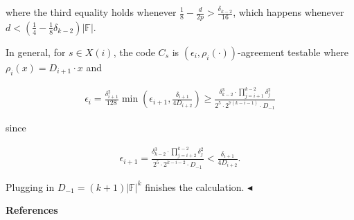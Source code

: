 where the third equality holds whenever $\frac{1}{8}-\frac{d}{2p}>\frac{\delta_{k-2}}{16}$, which happens whenever $d<\left(\frac{1}{4}-\frac{1}{8}\delta_{k-2}\right)|\mathbb{F}|$.\par




In general, for $s\in X(i)$, the code $C_{s}$ is $(\epsilon_{i},\rho_{i}(\cdot))$-agreement testable where $\rho_{i}(x)=D_{i+1}\cdot x$ and\par


\[\begin{gathered}
\displaystyle\epsilon_{i} \displaystyle=\frac{\delta_{i+1}^{2}}{128}\min\left(\epsilon_{i+1},\frac{\delta_{i+1}}{4D_{i+2}}\right)\geq\frac{\delta_{k-2}^{3}\cdot\prod_{j=i+1}^{k-2}\delta_{j}^{2}}{2^{5}\cdot 2^{7(k-i-1)}\cdot D_{-1}}
\end{gathered}\]


since\par


\[\begin{gathered}
\epsilon_{i+1}=\frac{\delta_{k-2}^{3}\cdot\prod_{j=i+2}^{k-2}\delta_{j}^{2}}{2^{5}\cdot 2^{k-i-2}\cdot D_{-1}}<\frac{\delta_{i+1}}{4D_{i+2}}.
\end{gathered}\]




Plugging in $D_{-1}=(k+1)|\mathbb{F}|^{k}$ finishes the calculation.
$\blacktriangleleft$\par






\par\medskip\noindent\textbf{References}\par



